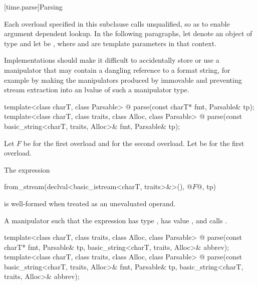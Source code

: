 %

[time.parse]{Parsing}

%

\pnum
Each  overload specified in this subclause
calls  unqualified,
so as to enable argument dependent lookup.
In the following paragraphs,
let  denote an object of type  and
let  be ,
where  and  are template parameters in that context.

\pnum
\recommended
Implementations should make it difficult to accidentally store or use
a manipulator that may contain a dangling reference to a format string,
for example by making the manipulators produced by  immovable and
preventing stream extraction into an lvalue of such a manipulator type.

\begin{itemdecl}
template<class charT, class Parsable>
  @\unspec@
    parse(const charT* fmt, Parsable& tp);
template<class charT, class traits, class Alloc, class Parsable>
  @\unspec@
    parse(const basic_string<charT, traits, Alloc>& fmt, Parsable& tp);
\end{itemdecl}

\begin{itemdescr}
\pnum
Let $F$ be  for the first overload and
 for the second overload.
Let  be  for the first overload.

\pnum
\constraints
The expression
\begin{codeblock}
from_stream(declval<basic_istream<charT, traits>&>(), @$F$@, tp)
\end{codeblock}
is well-formed when treated as an unevaluated operand.

\pnum
\returns
A manipulator such that
the expression 
has type ,
has value , and
calls .
\end{itemdescr}

\begin{itemdecl}
template<class charT, class traits, class Alloc, class Parsable>
  @\unspec@
    parse(const charT* fmt, Parsable& tp,
          basic_string<charT, traits, Alloc>& abbrev);
template<class charT, class traits, class Alloc, class Parsable>
  @\unspec@
    parse(const basic_string<charT, traits, Alloc>& fmt, Parsable& tp,
          basic_string<charT, traits, Alloc>& abbrev);
\end{itemdecl}

